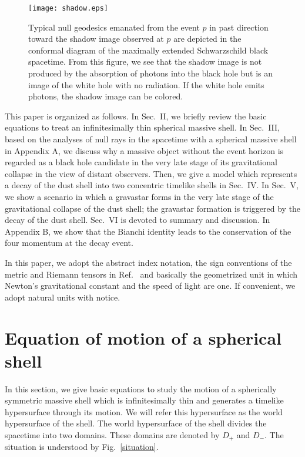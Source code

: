 \documentclass[aps,preprint,preprintnumber,nofootinbib,amsmath,amssymb,ascmac,bm,12pt]{revtex4}
\begin{document}
\begin{figure}[!h]
\centering\texttt{[image: shadow.eps]}
\caption{ Typical null geodesics emanated from the event $p$ in past direction 
toward the shadow image observed at $p$ are depicted in the conformal diagram of the 
maximally extended Schwarzschild black spacetime. From this figure, we see that the shadow image 
is not produced by the absorption of photons into the black hole but is an image of the 
white hole with no radiation. If the white hole emits photons, the shadow image can be colored.  }
\label{shadow}
\end{figure}




This paper is organized as follows. In Sec.~II, we briefly review 
the basic equations to treat an infinitesimally thin spherical massive shell.  
In Sec.~III, based on the analyses of null rays in the spacetime with a 
spherical massive shell in Appendix A, we discuss why a massive object without the event horizon 
is regarded as a black hole candidate in the very late stage of its gravitational collapse in the view of 
distant observers. Then,  we give a model which represents a decay of the dust shell into two concentric 
timelike shells in Sec.~IV. In Sec.~V, we show a scenario in which 
a gravastar forms in the very late stage of the gravitational collapse of the dust shell; 
the gravastar formation is triggered by the decay of the dust shell. 
Sec.~VI is devoted to summary and discussion. 
In Appendix B, we show that the Bianchi identity leads to the conservation of the four momentum 
at the decay event.

In this paper, we adopt the abstract index notation, 
the sign conventions of the metric and Riemann tensors 
in Ref.~\cite{Wald} and basically the geometrized unit in which Newton's gravitational constant 
and the speed of light are one. If convenient, we adopt natural units with notice. 

\section{Equation of motion of a spherical shell}\label{sec:shell}

In this section, we give basic equations to study the motion 
of a spherically symmetric massive shell which  
is infinitesimally thin and generates a timelike hypersurface
through its motion. We will refer this hypersurface as the world hypersurface of the shell. 
The world hypersurface of the shell divides the spacetime into two domains. 
These domains are denoted by $D_{+}$ and $D_{-}$.  
The situation is understood by Fig.~\ref{situation}. 
\end{document}
